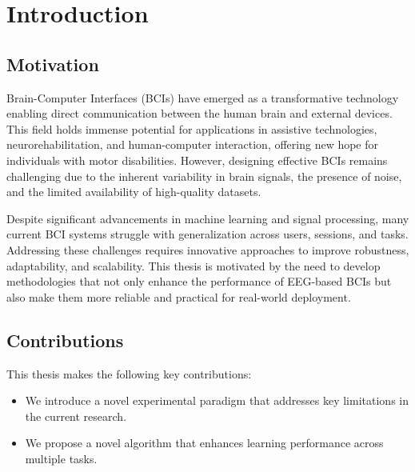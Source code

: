 \chapter{Introduction}
\label{chapter1}

\section{Motivation}
\label{ch1:sec:motivation}
\begin{paragraph}
Brain-Computer Interfaces (BCIs) have emerged as a transformative technology enabling direct communication between the human brain and external devices. This field holds immense potential for applications in assistive technologies, neurorehabilitation, and human-computer interaction, offering new hope for individuals with motor disabilities. However, designing effective BCIs remains challenging due to the inherent variability in brain signals, the presence of noise, and the limited availability of high-quality datasets.

Despite significant advancements in machine learning and signal processing, many current BCI systems struggle with generalization across users, sessions, and tasks. Addressing these challenges requires innovative approaches to improve robustness, adaptability, and scalability. This thesis is motivated by the need to develop methodologies that not only enhance the performance of EEG-based BCIs but also make them more reliable and practical for real-world deployment.
\end{paragraph}


\section{Contributions}
\label{ch1:sec:Contributions}
\begin{paragraph}
This thesis makes the following key contributions:
\end{paragraph}

\begin{itemize}[leftmargin=\paritemindent]
    \item We introduce a novel experimental paradigm that addresses key limitations in the current research.
    \item We propose a novel algorithm that enhances learning performance across multiple tasks.
\end{itemize}

